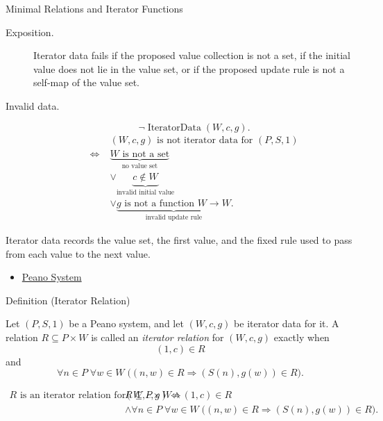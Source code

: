 \begin{topicbox}{Minimal Relations and Iterator Functions}
\begin{remark*}
\begin{description}
  \item[Exposition.]
  Iterator data fails if the proposed value collection is not a set, if the
  initial value does not lie in the value set, or if the proposed update rule
  is not a self-map of the value set.
  \item[Invalid data.]
  \[
  \neg\operatorname{IteratorData}(W,c,g).
  \]
  \[
  \begin{aligned}
  &(W,c,g) \text{ is not iterator data for } (P,S,1)\\
  \Longleftrightarrow\;&
  \underbrace{W \text{ is not a set}}_{\text{no value set}}\\
  &\lor \underbrace{c\notin W}_{\text{invalid initial value}}\\
  &\lor \underbrace{g \text{ is not a function } W\to W}_{\text{invalid update rule}}.
  \end{aligned}
  \]
\end{description}
\end{remark*}

\begin{remark*}[Interpretation]
Iterator data records the value set, the first value, and the fixed rule used
to pass from each value to the next value.
\end{remark*}

\begin{dependencies}
\begin{itemize}
  \item \hyperref[def:peano-system]{Peano System}
\end{itemize}
\end{dependencies}

\begin{definitionbox}{Definition (Iterator Relation)}
\begin{definition}
\label{def:iterator-relation}
Let $(P,S,1)$ be a Peano system, and let $(W,c,g)$ be iterator data for it. A
relation $R\subseteq P\times W$ is called an \emph{iterator relation} for
$(W,c,g)$ exactly when
\[
(1,c)\in R
\]
and
\[
\forall n\in P\;\forall w\in W\;
\bigl((n,w)\in R\Longrightarrow (S(n),g(w))\in R\bigr).
\]
\end{definition}
\end{definitionbox}

\begin{remark*}
\[
\begin{aligned}
R \text{ is an iterator relation for } (W,c,g)
\Longleftrightarrow\;&
R\subseteq P\times W
\land (1,c)\in R\\
&\land
\forall n\in P\;\forall w\in W\;
\bigl((n,w)\in R\Longrightarrow (S(n),g(w))\in R\bigr).
\end{aligned}
\]
\end{remark*}


\end{topicbox}
